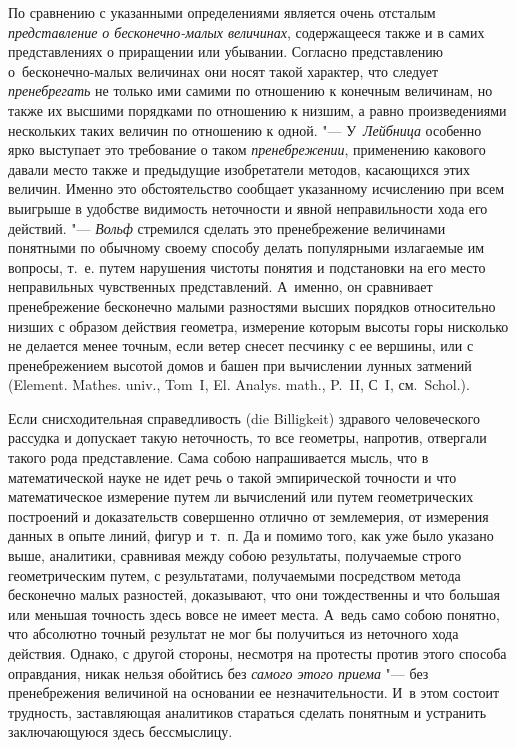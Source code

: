 По сравнению с указанными определениями является очень отсталым
{\em представление о бесконечно-малых величинах}, содержащееся также и в самих
представлениях о приращении или убывании. Согласно представлению
о~бесконечно-малых величинах они носят такой характер, что следует
{\em пренебрегать} не только ими самими по отношению к конечным величинам, но
также их высшими порядками по отношению к низшим, а равно произведениями
нескольких таких величин по отношению к одной. "--- У~{\em Лейбница} особенно
ярко выступает это требование о таком {\em пренебрежении}, применению какового
давали место также и предыдущие изобретатели методов, касающихся этих величин.
Именно это обстоятельство сообщает указанному исчислению при всем выигрыше в
удобстве видимость неточности и явной неправильности хода его действий. "---
{\em Вольф} стремился сделать это пренебрежение величинами понятными по
обычному своему способу делать популярными излагаемые им вопросы, т.~е. путем
нарушения чистоты понятия и подстановки на его место неправильных чувственных
представлений. А~именно, он сравнивает пренебрежение бесконечно малыми
разностями высших порядков относительно низших с образом действия геометра,
измерение которым высоты горы нисколько не делается менее точным, если ветер
снесет песчинку с ее вершины, или с пренебрежением высотой домов и башен при
вычислении лунных затмений (Ele\-ment. Mathes. univ., Tom~I, El. Ana\-lys.
math., P.~II, С~I, см.~Schol.).

Если снисходительная справедливость (die Billig\-keit) здравого человеческого
рассудка и допускает такую неточность, то все геометры, напротив, отвергали
такого рода представление. Сама собою напрашивается мысль, что в математической
науке не идет речь о такой эмпирической точности и что математическое измерение
путем ли вычислений или путем геометрических построений и доказательств
совершенно отлично от землемерия, от измерения данных в опыте линий, фигур
и~т.~п. Да и помимо того, как уже было указано выше, аналитики, сравнивая между
собою результаты, получаемые строго геометрическим путем, с результатами,
получаемыми посредством метода бесконечно малых разностей, доказывают, что они
тождественны и что большая или меньшая точность здесь вовсе не имеет места.
А~ведь само собою понятно, что абсолютно точный результат не мог бы получиться
из неточного хода действия. Однако, с другой стороны, несмотря на протесты
против этого способа оправдания, никак нельзя обойтись без
{\em самого этого приема} "--- без пренебрежения величиной на основании ее
незначительности. И~в этом состоит трудность, заставляющая аналитиков стараться
сделать понятным и устранить заключающуюся здесь бессмыслицу.

